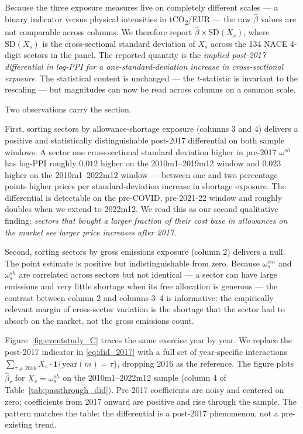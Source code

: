 Because the three exposure measures live on completely different scales --- a binary indicator versus physical intensities in tCO\textsubscript{2}/EUR --- the raw $\hat\beta$ values are not comparable across columns. We therefore report $\hat\beta \times \text{SD}(X_s)$, where $\text{SD}(X_s)$ is the cross-sectional standard deviation of $X_s$ across the 134 NACE 4-digit sectors in the panel. The reported quantity is the \emph{implied post-2017 differential in log-PPI for a one-standard-deviation increase in cross-sectional exposure}. The statistical content is unchanged --- the $t$-statistic is invariant to the rescaling --- but magnitudes can now be read across columns on a common scale.



Two observations carry the section.

First, sorting sectors by allowance-shortage exposure (columns 3 and 4) delivers a positive and statistically distinguishable post-2017 differential on both sample windows. A sector one cross-sectional standard deviation higher in pre-2017 $\omega^{sh}$ has log-PPI roughly $0.012$ higher on the 2010m1--2019m12 window and $0.023$ higher on the 2010m1--2022m12 window --- between one and two percentage points higher prices per standard-deviation increase in shortage exposure. The differential is detectable on the pre-COVID, pre-2021-22 window and roughly doubles when we extend to 2022m12. We read this as our second qualitative finding: \emph{sectors that bought a larger fraction of their cost base in allowances on the market see larger price increases after 2017}.

Second, sorting sectors by gross emissions exposure (column 2) delivers a null. The point estimate is positive but indistinguishable from zero. Because $\omega^{em}_s$ and $\omega^{sh}_s$ are correlated across sectors but not identical --- a sector can have large emissions and very little shortage when its free allocation is generous --- the contrast between column 2 and columns 3--4 is informative: the empirically relevant margin of cross-sector variation is the shortage that the sector had to absorb on the market, not the gross emissions count.

Figure~\ref{fig:eventstudy_C} traces the same exercise year by year. We replace the post-2017 indicator in \eqref{eq:did_2017} with a full set of year-specific interactions $\sum_{\tau \neq 2016} X_s \cdot \mathbf{1}\{\text{year}(m) = \tau\}$, dropping 2016 as the reference. The figure plots $\hat\beta_\tau$ for $X_s = \omega^{sh}_s$ on the 2010m1--2022m12 sample (column 4 of Table~\ref{tab:passthrough_did}). Pre-2017 coefficients are noisy and centered on zero; coefficients from 2017 onward are positive and rise through the sample. The pattern matches the table: the differential is a post-2017 phenomenon, not a pre-existing trend.


